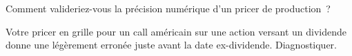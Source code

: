 \begin{interviewq}\label{iq:dv:trees-and-finite-difference-pricers-in-practice:5}
Comment valideriez-vous la précision numérique d'un pricer de production~?
\end{interviewq}

\begin{interviewq}\label{iq:dv:trees-and-finite-difference-pricers-in-practice:6}
Votre pricer en grille pour un call américain sur une action versant un dividende donne une  légèrement erronée juste avant la date ex-dividende. Diagnostiquer.
\end{interviewq}
